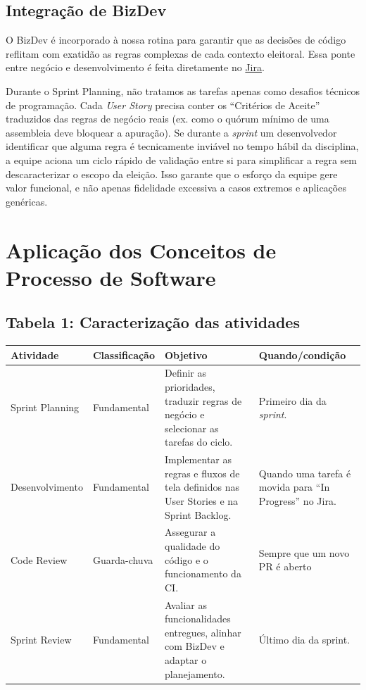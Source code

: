 \documentclass[12pt,a4paper]{article}
\begin{document}
\subsection{Integração de BizDev}
O BizDev é incorporado à nossa rotina para garantir que as decisões de código reflitam com exatidão as regras complexas de cada contexto eleitoral. Essa ponte entre negócio e desenvolvimento é feita diretamente no \href{https://www.atlassian.com/br/software/jira}{Jira}.

Durante o Sprint Planning, não tratamos as tarefas apenas como desafios técnicos de programação. Cada \textit{User Story} precisa conter os ``Critérios de Aceite'' traduzidos das regras de negócio reais (ex. como o quórum mínimo de uma assembleia deve bloquear a apuração). Se durante a \textit{sprint} um desenvolvedor identificar que alguma regra é tecnicamente inviável no tempo hábil da disciplina, a equipe aciona um ciclo rápido de validação entre si para simplificar a regra sem descaracterizar o escopo da eleição. Isso garante que o esforço da equipe gere valor funcional, e não apenas fidelidade excessiva a casos extremos e aplicações genéricas.

\section{Aplicação dos Conceitos de Processo de Software}

\subsection*{Tabela 1: Caracterização das atividades}
\begin{table}[H]
\centering
\begin{tabularx}{\textwidth}{|l|l|X|X|}
\hline
\textbf{Atividade} & \textbf{Classificação} & \textbf{Objetivo} & \textbf{Quando/condição} \\ \hline
Sprint Planning & Fundamental & Definir as prioridades, traduzir regras de negócio e selecionar as tarefas do ciclo. & Primeiro dia da \textit{sprint}. \\ \hline
Desenvolvimento & Fundamental & Implementar as regras e fluxos de tela definidos nas User Stories e na Sprint Backlog. & Quando uma tarefa é movida para ``In Progress'' no Jira. \\ \hline
Code Review & Guarda-chuva & Assegurar a qualidade do código e o funcionamento da CI. & Sempre que um novo PR é aberto \\ \hline
Sprint Review & Fundamental & Avaliar as funcionalidades entregues, alinhar com BizDev e adaptar o planejamento. & Último dia da sprint. \\ \hline
\end{tabularx}
\end{table}
\end{document}
